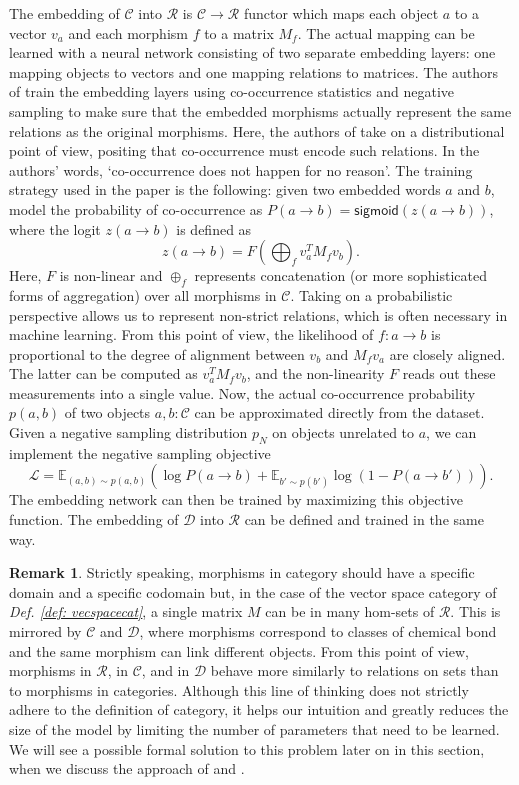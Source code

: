 \documentclass[11pt,a4paper,openright,twoside]{report}
\newcounter{mycounter}
\theoremstyle{plain}
\theoremstyle{definition}
\newtheorem{remark}[mycounter]{Remark}
\begin{document}
The embedding of $\mathcal{C}$ into $\mathcal{R}$ is   $\mathcal{C} \to \mathcal{R}$ functor which maps each object $a$ to a vector $v_a$ and each morphism $f$ to a matrix $M_f$. The actual mapping can be learned with a neural network consisting of two separate embedding layers: one mapping objects to vectors and one mapping relations to matrices. The authors of \cite{sheshmani2021categorical} train the embedding layers using co-occurrence statistics and negative sampling to make sure that the embedded morphisms actually represent the same relations as the original morphisms. Here, the authors of \cite{sheshmani2021categorical} take on a distributional point of view, positing that co-occurrence must encode such relations. In the authors' words, \lq  co-occurrence does not happen for no reason\rq. The training strategy used in the paper is the following: given two embedded words $a$ and $b$, model the probability of co-occurrence as $P(a \to b) = \mathsf{sigmoid}(z(a \to b))$, where the logit $z(a \to b)$ is defined as
\[z(a \to b) = F\left(\bigoplus_f v_a^TM_fv_b \right).\]
Here, $F$ is non-linear and $\oplus_f$ represents concatenation (or more sophisticated forms of aggregation) over all morphisms in $\mathcal{C}$. Taking on a probabilistic perspective allows us to represent non-strict relations, which is often necessary in machine learning. From this point of view, the likelihood of $f: a \to b$ is proportional to the degree of alignment between $v_b$ and $M_fv_a$ are closely aligned. The latter can be computed as $v_a^TM_fv_b$, and the non-linearity $F$ reads out these measurements into a single value. Now, the actual co-occurrence probability $p(a,b)$ of two objects $a,b : \mathcal{C}$ can be approximated directly from the dataset. Given a negative sampling distribution $p_N$ on objects unrelated to $a$, we can implement the negative sampling objective
\[\mathcal{L} = \mathbb{E}_{(a,b) \sim p(a,b)}\left(\log P(a \to b) + \mathbb{E}_{b' \sim p(b')}\log (1-P(a \to b'))\right).\]
The embedding network can then be trained by maximizing this objective function. The embedding of $\mathcal{D}$ into $\mathcal{R}$ can be defined and trained in the same way.

\begin{remark}
  Strictly speaking, morphisms in category should have a specific domain and a specific codomain but, in the case of the vector space category of \textit{Def. \ref{def: vecspacecat}}, a single matrix $M$ can be in many hom-sets of $\mathcal{R}$. This is mirrored by $\mathcal{C}$ and $\mathcal{D}$, where morphisms correspond to classes of chemical bond and the same morphism can link different objects. From this point of view, morphisms in $\mathcal{R}$, in $\mathcal{C}$, and in $\mathcal{D}$ behave more similarly to relations on sets than to morphisms in categories.  Although this line of thinking does not strictly adhere to the definition of category, it helps our intuition and greatly reduces the size of the model by limiting the number of parameters that need to be learned. We will see a possible formal solution to this problem later on in this section, when we discuss the approach of \cite{coecke2010mathematical} and \cite{lewis2019compositionality}.
\end{remark}
\end{document}
